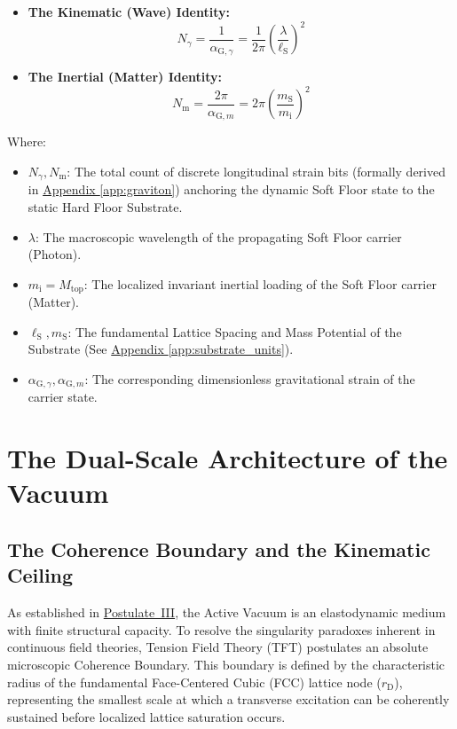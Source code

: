 \begin{itemize}
    \item \textbf{The Kinematic (Wave) Identity:}
    \begin{equation}
        N_{\gamma} = \frac{1}{\alpha_{\mathrm{G},\gamma}} = \frac{1}{2\pi} \left(\frac{\lambda}{\ell_{\mathrm{S}}}\right)^2
    \end{equation}
    
    \item \textbf{The Inertial (Matter) Identity:}
    \begin{equation}
        N_{\mathrm{m}} = \frac{2\pi}{\alpha_{\mathrm{G},m}} = 2\pi\left(\frac{m_{\mathrm{S}}}{m_{\mathrm i}}\right)^2
    \end{equation}
\end{itemize}

Where:
\begin{itemize}
    \item $N_{\gamma}, N_{\mathrm{m}}$: The total count of discrete longitudinal strain bits (formally derived in \hyperref[app:graviton]{Appendix \ref*{app:graviton}}) anchoring the dynamic Soft Floor state to the static Hard Floor Substrate.
    \item $\lambda$: The macroscopic wavelength of the propagating Soft Floor carrier (Photon).
    \item $m_{\mathrm i} = M_{\mathrm{top}}$: The localized invariant inertial loading of the Soft Floor carrier (Matter).
    \item $\ell_{\mathrm{S}}, m_{\mathrm{S}}$: The fundamental Lattice Spacing and Mass Potential of the Substrate (See \hyperref[app:substrate_units]{Appendix \ref*{app:substrate_units}}).
    \item $\alpha_{\mathrm{G},\gamma}, \alpha_{\mathrm{G},m}$: The corresponding dimensionless gravitational strain of the carrier state.
\end{itemize}

\chapter{The Dual-Scale Architecture of the Vacuum}

\section{The Coherence Boundary and the Kinematic Ceiling}
\label{sec:coherence_boundary}
As established in \hyperref[postulate:three]{\hyperref[postulate:three]{Postulate~III}}, the Active Vacuum is an elastodynamic medium with finite structural capacity. To resolve the singularity paradoxes inherent in continuous field theories, Tension Field Theory (TFT) postulates an absolute microscopic Coherence Boundary. This boundary is defined by the characteristic radius of the fundamental Face-Centered Cubic (FCC) lattice node ($r_{\mathrm{D}}$), representing the smallest scale at which a transverse excitation can be coherently sustained before localized lattice saturation occurs.


